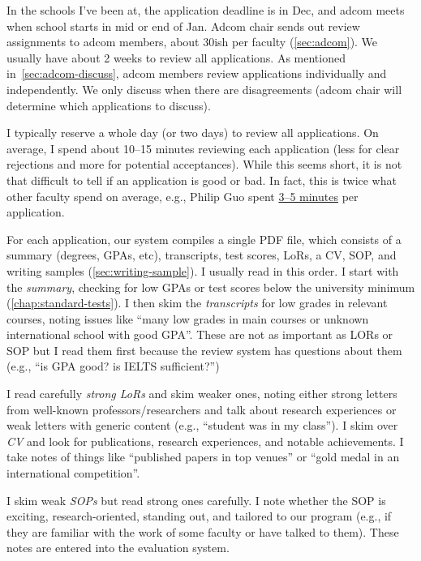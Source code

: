 \documentclass[oneside,11pt]{book}
\begin{document}
In the schools I've been at, the application deadline is in Dec, and adcom meets when school starts in mid or end of Jan. Adcom chair sends out review assignments to adcom members, about 30ish per faculty (\autoref{sec:adcom}). We usually have about 2 weeks to review all applications. As mentioned in~\autoref{sec:adcom-discuss}, adcom members review applications individually and independently. We only discuss when there are disagreements (adcom chair will determine which applications to discuss).

I typically reserve a whole day (or two days) to review all applications.
On average, I spend about 10--15 minutes reviewing each application (less for clear rejections and more for potential acceptances). While this seems short, it is not that difficult to tell if an application is good or bad.  In fact, this
is twice what other faculty spend on average, e.g., Philip Guo spent \href{https://pg.ucsd.edu/PhD-application-tips.htm}{3--5 minutes} per application.  

For each application, our system compiles a single PDF file, which consists of a summary (degrees, GPAs, etc), transcripts, test scores, LoRs, a CV, SOP, and writing samples (\autoref{sec:writing-sample}). I usually read in this order. I start with the \emph{summary}, checking for low GPAs or test scores below the university minimum (\autoref{chap:standard-tests}). I then skim the \emph{transcripts} for low grades in relevant courses, noting issues like ``many low grades in main courses or unknown international school with good GPA''.  These are not as important as LORs or SOP but I read them first because the review system has questions about them (e.g., ``is GPA good? is IELTS sufficient?'')

I read carefully \emph{strong LoRs} and skim weaker ones, noting either strong letters from well-known professors/researchers and talk about research experiences or weak letters with generic content (e.g., ``student was in my class''). I skim over \emph{CV} and look for publications, research experiences, and notable achievements. I take notes of things like ``published papers in top venues'' or ``gold medal in an international competition''.

I skim weak \emph{SOPs} but read strong ones carefully. I note whether the SOP is exciting, research-oriented, standing out, and tailored to our program (e.g., if they are familiar with the work of some faculty or have talked to them). These notes are entered into the evaluation system.
\end{document}
